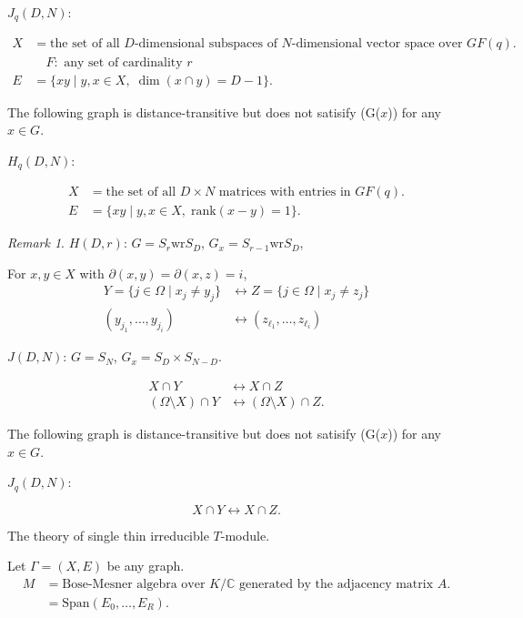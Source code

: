 \documentclass[
]{book}
\theoremstyle{definition}
\theoremstyle{definition}
\theoremstyle{definition}
\theoremstyle{definition}
\theoremstyle{remark}
\newtheorem*{remark}{Remark}
\begin{document}
\(J_q(D, N)\):

\begin{align}
X & = \text{the set of all $D$-dimensional subspaces of $N$-dimensional vector space over $GF(q)$.}\\
& \quad F: \text{ any set of cardinality $r$}\\
E & = \{xy\mid y, x\in X, \; \dim (x\cap y) = D-1\}.
\end{align}

The following graph is distance-transitive but does not satisify (G(\(x\))) for any \(x\in G\).

\(H_q(D,N)\):

\begin{align}
X & = \text{the set of all $D\times N$ matrices with entries in $GF(q)$}.\\
E & = \{xy\mid y, x\in X, \; \mathrm{rank}(x-y) = 1\}.
\end{align}

\begin{remark}
\leavevmode

\(H(D,r)\): \(G = S_r \mathrm{wr} S_D\), \(G_x = S_{r-1} \mathrm{wr} S_D\),

For \(x, y\in X\) with \(\partial(x, y) = \partial(x,z) = i\),
\begin{align}
Y = \{j\in \Omega \mid x_j\neq y_j\} & \leftrightarrow Z = \{j\in \Omega \mid x_j\neq z_j\}\\
(y_{j_1}, \ldots, y_{j_i}) & \leftrightarrow (z_{\ell_1}, \ldots, z_{\ell_i})
\end{align}

\(J(D, N)\): \(G = S_N\), \(G_x = S_D \times S_{N-D}\).

\begin{align}
X\cap Y & \leftrightarrow X \cap Z\\
(\Omega \setminus X)\cap Y & \leftrightarrow (\Omega \setminus X)\cap Z.
\end{align}

The following graph is distance-transitive but does not satisify (G(\(x\))) for any \(x\in G\).

\(J_q(D,N)\):

\[X\cap Y  \leftrightarrow X \cap Z.\]

\end{remark}

The theory of single thin irreducible \(T\)-module.

Let \(\Gamma = (X, E)\) be any graph.
\begin{align}
M & = \text{Bose-Mesner algebra over $K/\mathbb{C}$ generated by the adjacency matrix $A$.}\\
& = \mathrm{Span}(E_0, \ldots, E_R).
\end{align}
\end{document}
